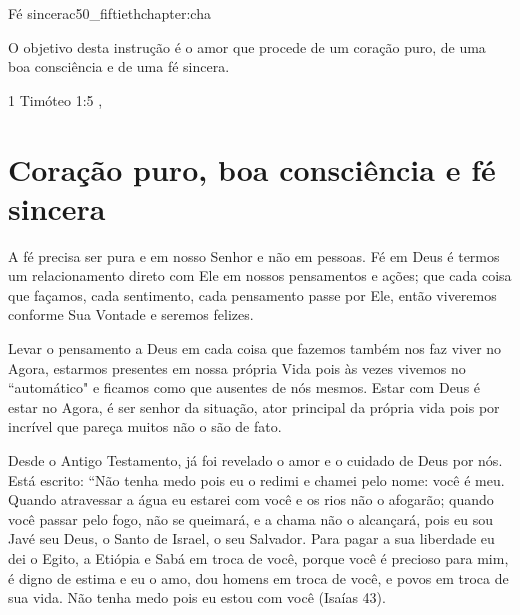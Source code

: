 \begin{chapterpage}{Fé sincera}{c50_fiftiethchapter:cha}
 
\begin{myquotation}O objetivo desta instrução é o amor que procede de um coração puro, de uma boa consciência e de uma fé sincera.
\par\vspace*{15mm}
\mbox{}\hfill \emdash{}1 Timóteo 1:5
, %
\par\end{myquotation}

\end{chapterpage}



\section{Coração puro, boa consciência e fé sincera}\label{c1_basicformatting:sec}

\emdash{}A fé precisa ser pura e em nosso Senhor e não em pessoas. Fé em Deus é termos um relacionamento direto com Ele em nossos pensamentos e ações; que cada coisa que façamos, cada sentimento, cada pensamento passe por Ele, então viveremos conforme Sua Vontade e seremos felizes.

\emdash{}Levar o pensamento a Deus em cada coisa que fazemos também nos faz viver no Agora, estarmos presentes em nossa própria Vida pois às vezes vivemos no ``automático" e ficamos como que ausentes de nós mesmos. Estar com Deus é estar no Agora, é ser senhor da situação, ator principal da própria vida pois por incrível que pareça muitos não o são de fato.

\emdash{}Desde o Antigo Testamento, já foi revelado o amor e o cuidado de Deus por nós. Está escrito: ``Não tenha medo pois eu o redimi e chamei pelo nome: você é meu. Quando atravessar a água eu estarei com você e os rios não o afogarão; quando você passar pelo fogo, não se queimará, e a chama não o alcançará, pois eu sou Javé seu Deus, o Santo de Israel, o seu Salvador. Para pagar a sua liberdade eu dei o Egito, a Etiópia e Sabá em troca de você, porque você é precioso para mim, é digno de estima e eu o amo, dou homens em troca de você, e povos em troca de sua vida. Não tenha medo pois eu estou com você (Isaías 43). 

